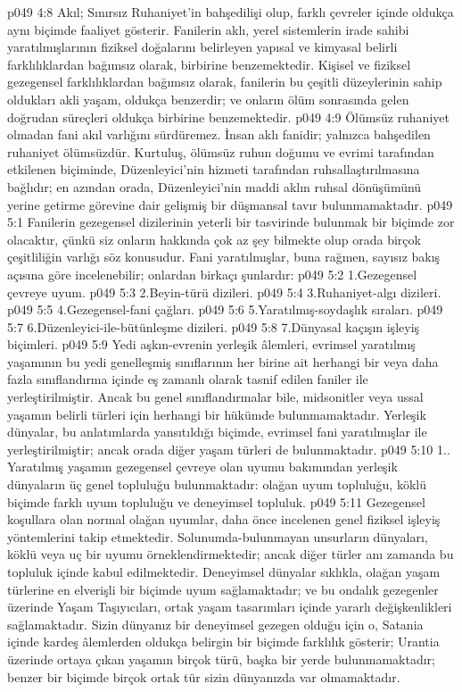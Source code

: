 \vs p049 4:8 Akıl; Sınırsız Ruhaniyet’in bahşedilişi olup, farklı çevreler içinde oldukça aynı biçimde faaliyet gösterir. Fanilerin aklı, yerel sistemlerin irade sahibi yaratılmışlarının fiziksel doğalarını belirleyen yapısal ve kimyasal belirli farklılıklardan bağımsız olarak, birbirine benzemektedir. Kişisel ve fiziksel gezegensel farklılıklardan bağımsız olarak, fanilerin bu çeşitli düzeylerinin sahip oldukları akli yaşam, oldukça benzerdir; ve onların ölüm sonrasında gelen doğrudan süreçleri oldukça birbirine benzemektedir.
\vs p049 4:9 Ölümsüz ruhaniyet olmadan fani akıl varlığını sürdüremez. İnsan aklı fanidir; yalnızca bahşedilen ruhaniyet ölümsüzdür. Kurtuluş, ölümsüz ruhun doğumu ve evrimi tarafından etkilenen biçiminde, Düzenleyici’nin hizmeti tarafından ruhsallaştırılmasına bağlıdır; en azından orada, Düzenleyici’nin maddi aklın ruhsal dönüşümünü yerine getirme görevine dair gelişmiş bir düşmansal tavır bulunmamaktadır.
\vs p049 5:1 Fanilerin gezegensel dizilerinin yeterli bir tasvirinde bulunmak bir biçimde zor olacaktır, çünkü siz onların hakkında çok az şey bilmekte olup orada birçok çeşitliliğin varlığı söz konusudur. Fani yaratılmışlar, buna rağmen, sayısız bakış açısına göre incelenebilir; onlardan birkaçı şunlardır:
\vs p049 5:2 1.\bibnobreakspace Gezegensel çevreye uyum.
\vs p049 5:3 2.\bibnobreakspace Beyin\hyp{}türü dizileri.
\vs p049 5:4 3.\bibnobreakspace Ruhaniyet\hyp{}algı dizileri.
\vs p049 5:5 4.\bibnobreakspace Gezegensel\hyp{}fani çağları.
\vs p049 5:6 5.\bibnobreakspace Yaratılmış\hyp{}soydaşlık sıraları.
\vs p049 5:7 6.\bibnobreakspace Düzenleyici\hyp{}ile\hyp{}bütünleşme dizileri.
\vs p049 5:8 7.\bibnobreakspace Dünyasal kaçışın işleyiş biçimleri.
\vs p049 5:9 Yedi aşkın\hyp{}evrenin yerleşik âlemleri, evrimsel yaratılmış yaşamının bu yedi genelleşmiş sınıflarının her birine ait herhangi bir veya daha fazla sınıflandırma içinde eş zamanlı olarak tasnif edilen faniler ile yerleştirilmiştir. Ancak bu genel sınıflandırmalar bile, midsonitler veya ussal yaşamın belirli türleri için herhangi bir hükümde bulunmamaktadır. Yerleşik dünyalar, bu anlatımlarda yansıtıldığı biçimde, evrimsel fani yaratılmışlar ile yerleştirilmiştir; ancak orada diğer yaşam türleri de bulunmaktadır.
\vs p049 5:10 1.. Yaratılmış yaşamın gezegensel çevreye olan uyumu bakımından yerleşik dünyaların üç genel topluluğu bulunmaktadır: olağan uyum topluluğu, köklü biçimde farklı uyum topluluğu ve deneyimsel topluluk.
\vs p049 5:11 Gezegensel koşullara olan normal olağan uyumlar, daha önce incelenen genel fiziksel işleyiş yöntemlerini takip etmektedir. Solunumda\hyp{}bulunmayan unsurların dünyaları, köklü veya uç bir uyumu örneklendirmektedir; ancak diğer türler anı zamanda bu topluluk içinde kabul edilmektedir. Deneyimsel dünyalar sıklıkla, olağan yaşam türlerine en elverişli bir biçimde uyum sağlamaktadır; ve bu ondalık gezegenler üzerinde Yaşam Taşıyıcıları, ortak yaşam tasarımları içinde yararlı değişkenlikleri sağlamaktadır. Sizin dünyanız bir deneyimsel gezegen olduğu için o, Satania içinde kardeş âlemlerden oldukça belirgin bir biçimde farklılık gösterir; Urantia üzerinde ortaya çıkan yaşamın birçok türü, başka bir yerde bulunmamaktadır; benzer bir biçimde birçok ortak tür sizin dünyanızda var olmamaktadır.
